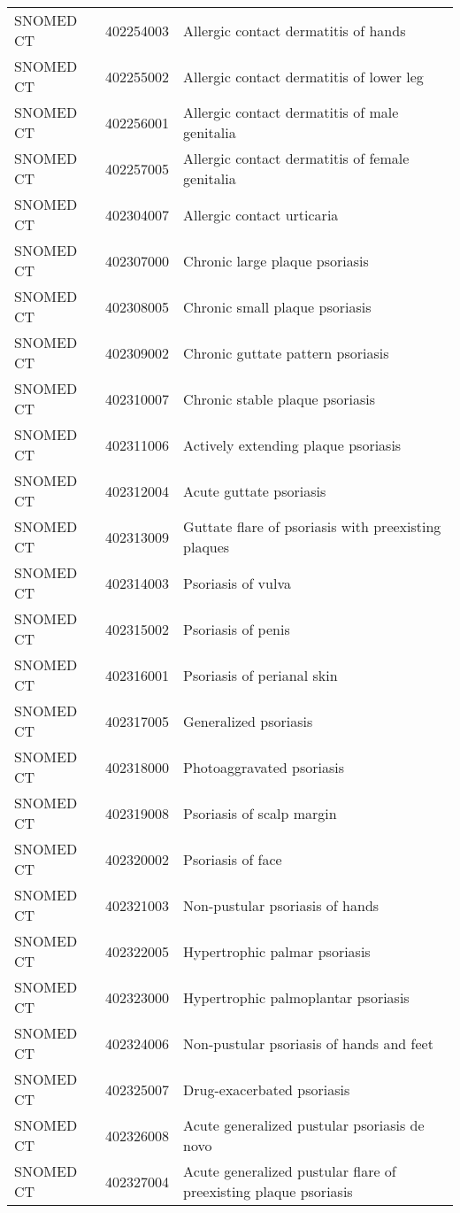 \begin{longtable}{p{}p{}p{}}
  SNOMED CT & 402254003 & Allergic contact dermatitis of hands \\ 
  SNOMED CT & 402255002 & Allergic contact dermatitis of lower leg \\ 
  SNOMED CT & 402256001 & Allergic contact dermatitis of male genitalia \\ 
  SNOMED CT & 402257005 & Allergic contact dermatitis of female genitalia \\ 
  SNOMED CT & 402304007 & Allergic contact urticaria \\ 
  SNOMED CT & 402307000 & Chronic large plaque psoriasis \\ 
  SNOMED CT & 402308005 & Chronic small plaque psoriasis \\ 
  SNOMED CT & 402309002 & Chronic guttate pattern psoriasis \\ 
  SNOMED CT & 402310007 & Chronic stable plaque psoriasis \\ 
  SNOMED CT & 402311006 & Actively extending plaque psoriasis \\ 
  SNOMED CT & 402312004 & Acute guttate psoriasis \\ 
  SNOMED CT & 402313009 & Guttate flare of psoriasis with preexisting plaques \\ 
  SNOMED CT & 402314003 & Psoriasis of vulva \\ 
  SNOMED CT & 402315002 & Psoriasis of penis \\ 
  SNOMED CT & 402316001 & Psoriasis of perianal skin \\ 
  SNOMED CT & 402317005 & Generalized psoriasis \\ 
  SNOMED CT & 402318000 & Photoaggravated psoriasis \\ 
  SNOMED CT & 402319008 & Psoriasis of scalp margin \\ 
  SNOMED CT & 402320002 & Psoriasis of face \\ 
  SNOMED CT & 402321003 & Non-pustular psoriasis of hands \\ 
  SNOMED CT & 402322005 & Hypertrophic palmar psoriasis \\ 
  SNOMED CT & 402323000 & Hypertrophic palmoplantar psoriasis \\ 
  SNOMED CT & 402324006 & Non-pustular psoriasis of hands and feet \\ 
  SNOMED CT & 402325007 & Drug-exacerbated psoriasis \\ 
  SNOMED CT & 402326008 & Acute generalized pustular psoriasis de novo \\ 
  SNOMED CT & 402327004 & Acute generalized pustular flare of preexisting plaque psoriasis \\ 

\end{longtable}
